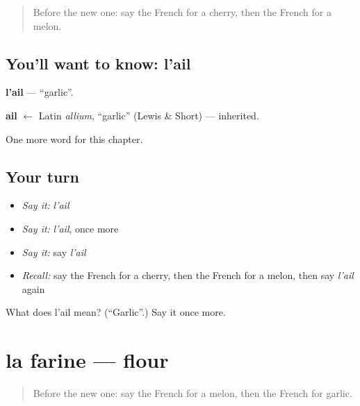 \label{lesson:FR-C120-ail}



\begin{quote}
Before the new one: say the French for a cherry, then the French for a melon.
\end{quote}

\subsection*{You'll want to know: l'ail}
\textbf{l'ail} — \textquotedblleft{}garlic\textquotedblright{}.

\begin{cousinweb}
\textbf{ail} $\leftarrow$ Latin \emph{allium}, \textquotedblleft{}garlic\textquotedblright{} (Lewis \& Short) — inherited.
\end{cousinweb}

\begin{grammarlens}[title={What you've built}]
One more word for this chapter.
\end{grammarlens}

\subsection*{Your turn}
\begin{itemize}
\raggedright
  \item \emph{Say it:} \emph{l'ail}
  \item \emph{Say it:} \emph{l'ail}, once more
  \item \emph{Say it:} say \emph{l'ail}
  \item \emph{Recall:} say the French for a cherry, then the French for a melon, then say \emph{l'ail} again
\end{itemize}

\begin{tcolorbox}[breakable,colback=teal!4,colframe=teal!35!black,title={Before you move on}]
What does l'ail mean? (\textquotedblleft{}Garlic\textquotedblright{}.) Say it once more.
\end{tcolorbox}
\section[la farine]{la farine — flour}

\label{lesson:FR-C120-farine}



\begin{quote}
Before the new one: say the French for a melon, then the French for garlic.
\end{quote}

